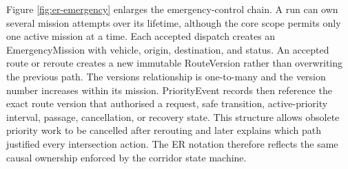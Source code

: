 Figure \ref{fig:er-emergency} enlarges the emergency-control chain. A run can own several mission attempts over its lifetime, although the core scope permits only one active mission at a time. Each accepted dispatch creates an EmergencyMission with vehicle, origin, destination, and status. An accepted route or reroute creates a new immutable RouteVersion rather than overwriting the previous path. The versions relationship is one-to-many and the version number increases within its mission. PriorityEvent records then reference the exact route version that authorised a request, safe transition, active-priority interval, passage, cancellation, or recovery state. This structure allows obsolete priority work to be cancelled after rerouting and later explains which path justified every intersection action. The ER notation therefore reflects the same causal ownership enforced by the corridor state machine.

